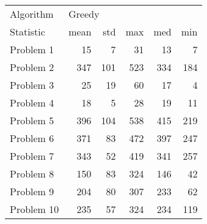 \begin{tabular}{lrrrrr}
\toprule
Algorithm & \multicolumn{5}{l}{Greedy} \\
Statistic &   mean &  std &  max &  med &  min \\
\midrule
Problem 1  &     15 &    7 &   31 &   13 &    7 \\
Problem 2  &    347 &  101 &  523 &  334 &  184 \\
Problem 3  &     25 &   19 &   60 &   17 &    4 \\
Problem 4  &     18 &    5 &   28 &   19 &   11 \\
Problem 5  &    396 &  104 &  538 &  415 &  219 \\
Problem 6  &    371 &   83 &  472 &  397 &  247 \\
Problem 7  &    343 &   52 &  419 &  341 &  257 \\
Problem 8  &    150 &   83 &  324 &  146 &   42 \\
Problem 9  &    204 &   80 &  307 &  233 &   62 \\
Problem 10 &    235 &   57 &  324 &  234 &  119 \\
\bottomrule
\end{tabular}
